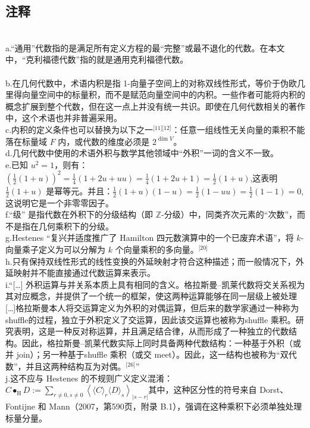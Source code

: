 \subsection{注释}\\
a.“通用”代数指的是满足所有定义方程的最“完整”或最不退化的代数。在本文中，“克利福德代数”指的就是通用克利福德代数。\\\\
b.在几何代数中，术语内积是指 1-向量子空间上的对称双线性形式，等价于伪欧几里得向量空间中的标量积，而不是赋范向量空间中的内积。一些作者可能将内积的概念扩展到整个代数，但在这一点上并没有统一共识。即使在几何代数相关的著作中，这个术语也并非普遍采用。\\
c.内积的定义条件也可以替换为以下之一\(^\text{[11][12]}\)：任意一组线性无关向量的乘积不能落在标量域 $F$ 内，或代数的维度必须是 $2^{\dim V}$。\\
d.几何代数中使用的术语外积与数学其他领域中“外积”一词的含义不一致。\\
e.已知 $u^2 = 1$，则有：$\left(\tfrac{1}{2}(1+u)\right)^2 = \tfrac{1}{4}(1 + 2u + uu)= \tfrac{1}{4}(1 + 2u + 1)= \tfrac{1}{2}(1+u)$,这表明 $\tfrac{1}{2}(1+u)$ 是幂等元。并且：$\tfrac{1}{2}(1+u)(1-u)= \tfrac{1}{2}(1 - uu)= \tfrac{1}{2}(1 - 1)= 0$,这说明它是一个非零零因子。\\
f.“级” 是指代数在外积下的分级结构（即 $\mathbb{Z}$-分级）中，同类齐次元素的“次数”，而不是指在几何乘积下的分级。\\
g.Hestenes “复兴并适度推广了 Hamilton 四元数演算中的一个已废弃术语”，将 $k$-向量乘子定义为可以分解为 $k$ 个向量乘积的多向量。\(^\text{[20]}\)\\
h.只有保持双线性形式的线性变换的外延映射才符合这种描述；而一般情况下，外延映射并不能直接通过代数运算来表示。\\
i.“[…] 外积运算与并关系本质上具有相同的含义。格拉斯曼–凯莱代数将交关系视为其对应概念，并提供了一个统一的框架，使这两种运算能够在同一层级上被处理 […]格拉斯曼本人将交运算定义为外积的对偶运算，但后来的数学家通过一种称为shuffle的过程，独立于外积定义了交运算，因此该交运算也被称为shuffle 乘积。研究表明，这是一种反对称运算，并且满足结合律，从而形成了一种独立的代数结构。因此，格拉斯曼–凯莱代数实际上同时具备两种代数结构：一种基于外积（或并 join）；另一种基于shuffle 乘积（或交 meet）。因此，这一结构也被称为“双代数”，并且这两种结构互为对偶。\(^\text{[26]}\)”\\
j.这不应与 Hestenes 的不规则广义定义混淆：$C \bullet_{\text{H}} D := \sum_{r \neq 0, s \neq 0} \left\langle \langle C \rangle_{r} \langle D \rangle_{s} \right\rangle_{|s-r|}$其中，这种区分性的符号来自 Dorst、Fontijne 和 Mann（2007，第590页，附录 B.1），强调在这种乘积下必须单独处理标量分量。\\
